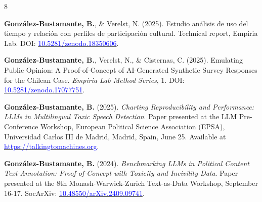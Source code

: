 \begin{publications}

\begin{benumerate}{8}

\item{{\bfseries González-Bustamante, B.}, \& Verelst, N. (2025). Estudio análisis de uso del tiempo y relación con perfiles de participación cultural. Technical report, Empiria Lab. DOI: \href{https://doi.org/10.5281/zenodo.18350606}{\textcolor{blue}{10.5281/zenodo.18350606}}.}\vspace{1mm}

\item{{\bfseries González-Bustamante, B.}, Verelst, N., \& Cisternas, C. (2025). Emulating Public Opinion: A Proof-of-Concept of AI-Generated Synthetic Survey Responses for the Chilean Case. {\itshape Empiria Lab Method Series}, 1. DOI: \href{https://doi.org/10.5281/zenodo.17077751}{\textcolor{blue}{10.5281/zenodo.17077751}}.}\vspace{1mm}

\item{{\bfseries González-Bustamante, B.} (2025). {\itshape Charting Reproducibility and Performance: LLMs in Multilingual Toxic Speech Detection}. Paper presented at the LLM Pre-Conference Workshop, European Political Science Association (EPSA), Universidad Carlos III de Madrid, Madrid, Spain, June 25. Available at \href{https://talkingtomachines.org/large-language-models-workshop/}{\textcolor{blue}{https://talkingtomachines.org}}.}\vspace{1mm}

\item{{\bfseries González-Bustamante, B.} (2024). {\itshape Benchmarking LLMs in Political Content Text-Annotation: Proof-of-Concept with Toxicity and Incivility Data}. Paper presented at the 8th Monash-Warwick-Zurich Text-as-Data Workshop, September 16-17. SocArXiv: \href{https://doi.org/10.48550/arXiv.2409.09741}{\textcolor{blue}{10.48550/arXiv.2409.09741}}.}\vspace{1mm}




\end{benumerate}
\end{publications}
